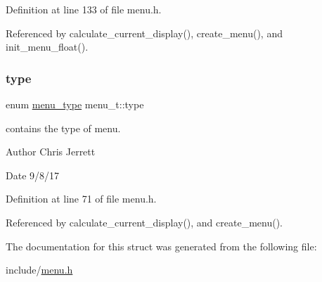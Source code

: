 Definition at line 133 of file menu.\+h.



Referenced by calculate\+\_\+current\+\_\+display(), create\+\_\+menu(), and init\+\_\+menu\+\_\+float().

\mbox{\label{structmenu__t_a110244ceb7d2a7cba95cfc5758d61c01}} 
\subsubsection{\texorpdfstring{type}{type}}
{\footnotesize\ttfamily enum \hyperlink{menu_8h_a6bbf4baf5018b0d76aab6c2e6bf85e62}{menu\+\_\+type} menu\+\_\+t\+::type}



contains the type of menu. 

\begin{DoxyAuthor}{Author}
Chris Jerrett 
\end{DoxyAuthor}
\begin{DoxyDate}{Date}
9/8/17 
\end{DoxyDate}


Definition at line 71 of file menu.\+h.



Referenced by calculate\+\_\+current\+\_\+display(), and create\+\_\+menu().



The documentation for this struct was generated from the following file\+:\begin{DoxyCompactItemize}
\item 
include/\hyperlink{menu_8h}{menu.\+h}\end{DoxyCompactItemize}
